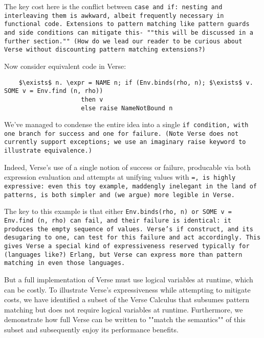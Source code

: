 \documentclass[]{article}
\begin{document}
\bigskip 

The key cost here is the conflict between \tt{case} and \tt{if}: nesting and 
interleaving them is awkward, albeit frequently necessary in functional code. 
Extensions to pattern matching like pattern guards and side conditions can 
mitigate this- ""this will be discussed in a further section."" (How do we lead 
our reader to be curious about Verse without discounting pattern matching 
extensions?)

\bigskip

Now consider equivalent code in Verse: 
\verselst

\begin{lstlisting}
    $\exists$ n. \expr = NAME n; if (Env.binds(rho, n); $\exists$ v. SOME v = Env.find (n, rho)) 
                     then v
                     else raise NameNotBound n
\end{lstlisting}

\bigskip

We've managed to condense the entire idea into a single \tt{if} condition, 
with one branch for success and one for failure. (Note Verse does not currently
support exceptions; we use an imaginary \tt{raise} keyword to illustrate
equivalence.)

Indeed, Verse's use of a single notion of success or failure, producable via 
both expression evaluation and attempts at unifying values with \tt{=}, is 
highly expressive: even this toy example, maddengly inelegant in the land of 
patterns, is both simpler and (we argue) more legible in Verse. 

The key to this example is that either \tt{Env.binds(rho, n)}  or \tt{SOME v =
Env.find (n, rho)} can fail, and their failure is identical: it produces the
empty sequence of values. Verse's \tt{if} construct, and its desugaring to
\tt{one}, can test for this failure and act accordingly. This gives Verse a 
special kind of expressiveness reserved typically for (languages like?) Erlang, 
but Verse can express more than pattern matching in even those languages. 




But a full implementation of Verse must use logical variables at runtime, which
can be costly. To illustrate Verse's expressiveness while attempting to mitigate
costs, we have identified a subset of the Verse Calculus that subsumes pattern
matching but does not require logical variables at runtime. Furthermore, we
demonstrate how full Verse can be written to ""match the semantics"" of this
subset and subsequently enjoy its performance benefits. 
\end{document}
